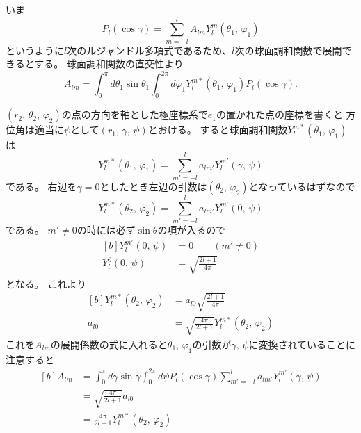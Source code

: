 \documentclass[../../master.tex]{subfiles}
\begin{document}
いま
\begin{equation}
	P_l(\cos\gamma) = \sum_{m=-l}^{l} A_{lm}Y_l^m(\theta_1,\,\varphi_1)
\end{equation}
というように\(l\)次のルジャンドル多項式であるため、\(l\)次の球面調和関数で展開できるとする。%
球面調和関数の直交性より
\begin{equation}
	A_{lm} = \int_{0}^{\pi} d\theta_1 \sin\theta_1 \int_{0}^{2\pi} d\varphi_1 Y_l^{m*}(\theta_1,\,\varphi_1) P_l(\cos\gamma).
\end{equation}

\((r_2,\,\theta_2,\,\varphi_2)\)の点の方向を軸とした極座標系で\(e_1\)の置かれた点の座標を書くと
方位角は適当に\(\psi\)として\((r_1,\,\gamma,\,\psi)\)とおける。
すると球面調和関数\(Y_l^{m*}(\theta_1,\,\varphi_1)\)は
\begin{equation}
	Y_l^{m*}(\theta_1,\,\varphi_1) = \sum_{m'=-l}^{l} a_{lm'}Y_l^{m'}(\gamma,\,\psi)
\end{equation}
である。
右辺を\(\gamma=0\)としたとき左辺の引数は\((\theta_2,\,\varphi_2)\)となっているはずなので
\begin{equation}
	Y_l^{m*}(\theta_2,\,\varphi_2) = \sum_{m'=-l}^{l} a_{lm'}Y_l^{m'}(0,\,\psi)
\end{equation}
である。
\(m'\neq0\)の時には必ず\(\sin\theta\)の項が入るので
\begin{equation}\begin{aligned}[b]
    Y_l^{m'}(0,\,\psi) &= 0 \qquad (m'\neq 0) \\
	Y_l^{0}(0,\,\psi) &= \sqrt{\frac{2l+1}{4\pi}}
\end{aligned}\end{equation}
となる。
これより
\begin{equation}\begin{aligned}[b]
    Y_l^{m*}(\theta_2,\,\varphi_2) &= a_{l0}\sqrt{\frac{2l+1}{4\pi}}\\
	a_{l0}& = \sqrt{\frac{4\pi}{2l+1}} Y_l^{m*}(\theta_2,\,\varphi_2)
\end{aligned}\end{equation}
これを\(A_{lm}\)の展開係数の式に入れると\(\theta_1,\,\varphi_1\)の引数が\(\gamma,\,\psi\)に変換されていることに注意すると
\begin{equation}\begin{aligned}[b]
    A_{lm} &=\int_{0}^{\pi} d\gamma \sin\gamma \int_{0}^{2\pi} d\psi
	P_l(\cos\gamma)\sum_{m'=-l}^{l}a_{lm'}Y_l^{m'}(\gamma,\,\psi)\\
	&=\sqrt{\frac{4\pi}{2l+1}}a_{l0}\\
	&=\frac{4\pi}{2l+1}Y_l^{m*}(\theta_2,\,\varphi_2)
\end{aligned}\end{equation}
\end{document}
